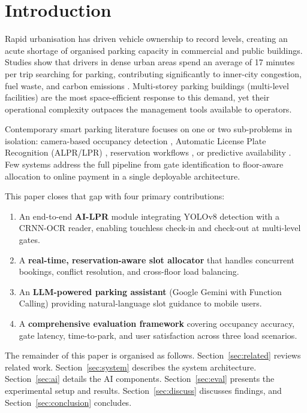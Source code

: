 \documentclass[runningheads]{llncs}
\begin{document}
\section{Introduction}

Rapid urbanisation has driven vehicle ownership to record
levels, creating an acute shortage of organised parking
capacity in commercial and public buildings. Studies show that
drivers in dense urban areas spend an average of 17 minutes
per trip searching for parking, contributing significantly to
inner-city congestion, fuel waste, and carbon emissions
\cite{ref_shoup2011}. Multi-storey parking buildings
(multi-level facilities) are the most space-efficient response
to this demand, yet their operational complexity outpaces the
management tools available to operators.

Contemporary smart parking literature focuses on one or two
sub-problems in isolation: camera-based occupancy detection
\cite{ref_padmavathi2024}, Automatic License Plate Recognition
(ALPR/LPR) \cite{ref_ieee_multilevel2024}, reservation
workflows \cite{ref_plosone2025}, or predictive availability
\cite{ref_dhopre2024}. Few systems address the full pipeline
from gate identification to floor-aware allocation to
online payment in a single deployable architecture.

This paper closes that gap with four primary contributions:
\begin{enumerate}
  \item An end-to-end \textbf{AI-LPR} module integrating
        YOLOv8 detection with a CRNN-OCR reader, enabling
        touchless check-in and check-out at multi-level gates.
  \item A \textbf{real-time, reservation-aware slot allocator}
        that handles concurrent bookings, conflict resolution,
        and cross-floor load balancing.
  \item An \textbf{LLM-powered parking assistant} (Google
        Gemini with Function Calling) providing
        natural-language slot guidance to mobile users.
  \item A \textbf{comprehensive evaluation framework}
        covering occupancy accuracy, gate latency,
        time-to-park, and user satisfaction across three
        load scenarios.
\end{enumerate}

The remainder of this paper is organised as follows.
Section~\ref{sec:related} reviews related work.
Section~\ref{sec:system} describes the system architecture.
Section~\ref{sec:ai} details the AI components.
Section~\ref{sec:eval} presents the experimental setup and
results. Section~\ref{sec:discuss} discusses findings, and
Section~\ref{sec:conclusion} concludes.
\end{document}
